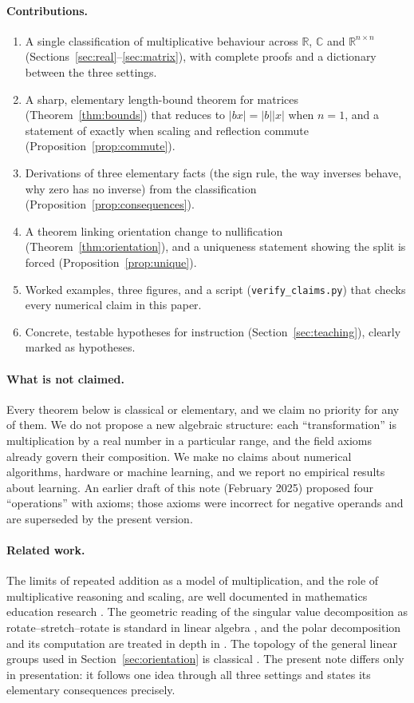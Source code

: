 \documentclass[12pt]{article}
\theoremstyle{definition}
\theoremstyle{remark}
\newcommand{\R}{\mathbb{R}}
\newcommand{\C}{\mathbb{C}}
\begin{document}
\paragraph{Contributions.}
\begin{enumerate}
  \item A single classification of multiplicative behaviour across $\R$, $\C$ and $\R^{n\times n}$ (Sections~\ref{sec:real}--\ref{sec:matrix}), with complete proofs and a dictionary between the three settings.
  \item A sharp, elementary length-bound theorem for matrices (Theorem~\ref{thm:bounds}) that reduces to $|bx|=|b||x|$ when $n=1$, and a statement of exactly when scaling and reflection commute (Proposition~\ref{prop:commute}).
  \item Derivations of three elementary facts (the sign rule, the way inverses behave, why zero has no inverse) from the classification (Proposition~\ref{prop:consequences}).
  \item A theorem linking orientation change to nullification (Theorem~\ref{thm:orientation}), and a uniqueness statement showing the split is forced (Proposition~\ref{prop:unique}).
  \item Worked examples, three figures, and a script (\texttt{verify\_claims.py}) that checks every numerical claim in this paper.
  \item Concrete, testable hypotheses for instruction (Section~\ref{sec:teaching}), clearly marked as hypotheses.
\end{enumerate}

\paragraph{What is not claimed.}
Every theorem below is classical or elementary, and we claim no priority for any of them. We do not propose a new algebraic structure: each ``transformation'' is multiplication by a real number in a particular range, and the field axioms already govern their composition. We make no claims about numerical algorithms, hardware or machine learning, and we report no empirical results about learning. An earlier draft of this note (February 2025) proposed four ``operations'' with axioms; those axioms were incorrect for negative operands and are superseded by the present version.

\paragraph{Related work.}
The limits of repeated addition as a model of multiplication, and the role of multiplicative reasoning and scaling, are well documented in mathematics education research \cite{fischbein1985,vergnaud1983,greer1992,thompson2003}. The geometric reading of the singular value decomposition as rotate--stretch--rotate is standard in linear algebra \cite{horn2013,golub2013}, and the polar decomposition and its computation are treated in depth in \cite{higham1986,horn2013}. The topology of the general linear groups used in Section~\ref{sec:orientation} is classical \cite{hall2015}. The present note differs only in presentation: it follows one idea through all three settings and states its elementary consequences precisely.
\end{document}
